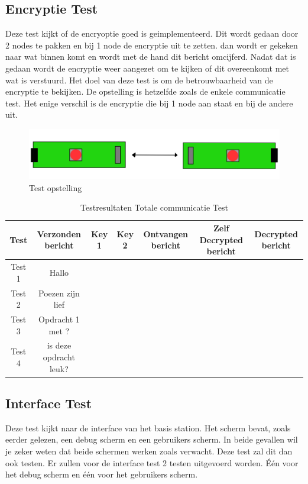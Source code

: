 \subsection{Encryptie Test}
Deze test kijkt of de encryoptie goed is geimplementeerd. Dit wordt gedaan door 2 nodes te pakken en bij 1 node de encryptie uit te zetten.
dan wordt er gekeken naar wat binnen komt en wordt met de hand dit bericht omcijferd. Nadat dat is gedaan wordt de encryptie weer aangezet 
om te kijken of dit overeenkomt met wat is verstuurd. Het doel van deze test is om de betrouwbaarheid van de encryptie te bekijken.
De opstelling is hetzelfde zoals de enkele communicatie test. Het enige verschil is de encryptie die bij 1 node aan staat en bij de andere uit.
\begin{figure}[h]
    \centering
    \includegraphics{img/Screenshot_292.png}
    \caption{Test opstelling}
    \label{fig:TestCom}
\end{figure}
\begin{table}[h]
    \centering
    \begin{tabular}{|c||c|c|c|c|c|c|}
        Test    & Verzonden bericht      & Key 1 & Key 2 & Ontvangen bericht & Zelf Decrypted bericht & Decrypted bericht \\\hline
        Test 1  & Hallo                  &       &       &                   &                        &                   \\\hline
        Test 2  & Poezen zijn lief       &       &       &                   &                        &                   \\\hline
        Test 3  & Opdracht 1 met ?       &       &       &                   &                        &                   \\\hline
        Test 4  & is deze opdracht leuk? &       &       &                   &                        &                   \\\hline
    \end{tabular}
    \caption{Testresultaten Totale communicatie Test}
    \label{Test:TotCom}
\end{table}

\subsection{Interface Test}
Deze test kijkt naar de interface van het basis station. Het scherm bevat, zoals eerder gelezen, een debug scherm en een gebruikers scherm. 
In beide gevallen wil je zeker weten dat beide schermen werken zoals verwacht. Deze test zal dit dan ook testen. Er zullen voor de 
interface test 2 testen uitgevoerd worden. Één voor het debug scherm en één voor het gebruikers scherm.

